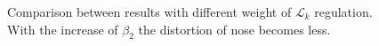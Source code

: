 \documentclass[10pt,twocolumn,letterpaper]{article}
\begin{document}
\begin{figure}[htbp]
\centering
{}
\caption{Comparison between results with different weight of $\mathcal{L}_{k} $ regulation. With the increase of $\beta_2$ the distortion of nose becomes less.}
\label{fig:region_effect}
\end{figure}
\end{document}
